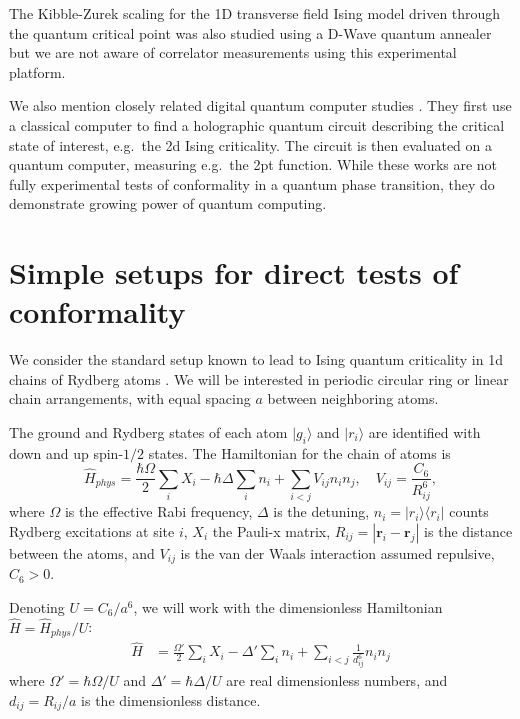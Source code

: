 \documentclass[a4paper,11pt]{article}
\theoremstyle{remark}
\theoremstyle{theorem}
\begin{document}
The Kibble-Zurek scaling for the 1D transverse field Ising model driven through the quantum critical point was also studied using a D-Wave quantum annealer \cite{King:2022phl} but we are not aware of correlator measurements using this experimental platform.

We also mention closely related digital quantum computer studies \cite{Anand:2022cdi,Dborin:2022zdd,Haghshenas:2023bje}. They first use a classical computer to find a holographic quantum circuit describing the critical state of interest, e.g.~the 2d Ising criticality. The circuit is then evaluated on a quantum computer, measuring e.g.~the 2pt function. While these works are not fully experimental tests of conformality in a quantum phase transition, they do demonstrate growing power of quantum computing.

 

\section{Simple setups for direct tests of conformality}
\label{sec:prop}

We consider the standard setup known to lead to Ising quantum criticality in 1d chains of Rydberg atoms \cite[Eq.~(1)]{Browaeys:2020kzz}. We will be interested in periodic circular ring or linear chain arrangements, with equal spacing $a$ between neighboring atoms.

The ground and Rydberg states of each atom $|g_i\rangle$ and $|r_i\rangle$ are identified with down and up spin-$1/2$ states. 
The Hamiltonian for the chain of atoms is
\begin{equation}
	\hat H_{phys}=\frac{\hbar \Omega}{2} \sum_i X_i - \hbar \Delta \sum_i n_i +  \sum_{i<j}V_{ij} n_{i}n_{j},\quad V_{ij}= \frac{C_6}{R_{ij}^6},
	\label{eq:model}
\end{equation}
where $\Omega$ is the effective Rabi frequency, $\Delta$ is the detuning, $n_i=|r_i\rangle \langle r_i|$ counts Rydberg excitations at site $i$,  $X_i$ the Pauli-x matrix, $R_{ij}=|\mathbf{r}_i-\mathbf{r}_j|$ is the distance between the atoms, and $V_{ij}$ is the van der Waals interaction assumed repulsive, $C_6>0$.


Denoting $U=C_6/a^6$, we will work with the dimensionless Hamiltonian $\hat H=\hat H_{phys}/U$:
\begin{align}
	\hat H &= \frac{\Omega'}{2} \sum_i X_i  - \Delta' \sum_i n_i + \sum_{i<j}\frac{1}{d_{ij}^6}  n_{i}n_{j}
	\label{eq:modelp}
\end{align}
where $\Omega'=\hbar \Omega/U$ and $\Delta'=\hbar \Delta/U$ are real dimensionless numbers, and $d_{ij}=R_{ij}/a$ is the dimensionless distance. 
\end{document}
